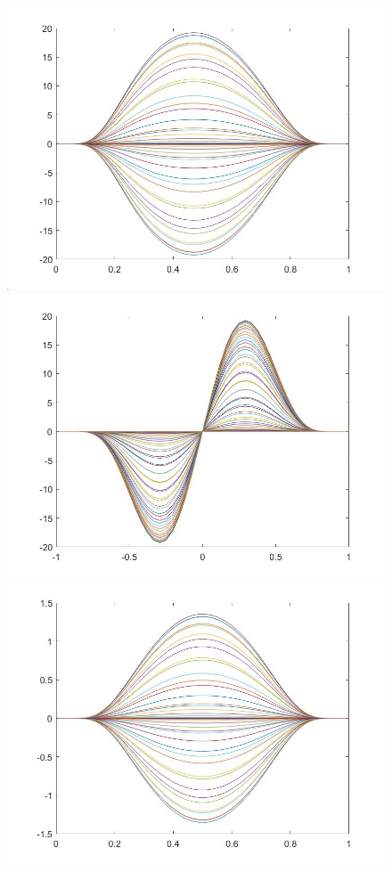 \documentclass[11pt, a4paper]{article}
\theoremstyle{definition}
\begin{document}
\begin{figure}[h]
	\includegraphics[scale=0.3]{PerttxN1.jpg}
	\includegraphics[scale=0.3]{PerttxN2.jpg}\\
	\includegraphics[scale=0.3]{PerttxN3.jpg}

\end{figure}
\end{document}
